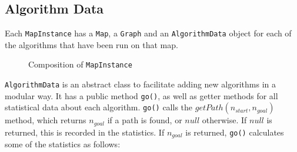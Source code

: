 \documentclass[12pt,notitlepage]{report}
\begin{document}
\subsection{Algorithm Data}

Each {\tt MapInstance} has a {\tt Map}, a {\tt Graph} and an {\tt AlgorithmData} object for each of the algorithms that have been run on that map.\\

\begin{figure}
\centering
{}
\caption{Composition of {\tt MapInstance}}
\end{figure}

\noindent
{\tt AlgorithmData} is an abstract class to facilitate adding new algorithms in a modular way. It has a public method {\tt go()}, as well as getter methods for all statistical data about each algorithm. {\tt go()} calls the $getPath(n_{start},n_{goal})$ method, which returns $n_{goal}$ if a path is found, or $null$ otherwise. If $null$ is returned, this is recorded in the statistics. If $n_{goal}$ is returned, {\tt go()} calculates some of the statistics as follows:
\end{document}
